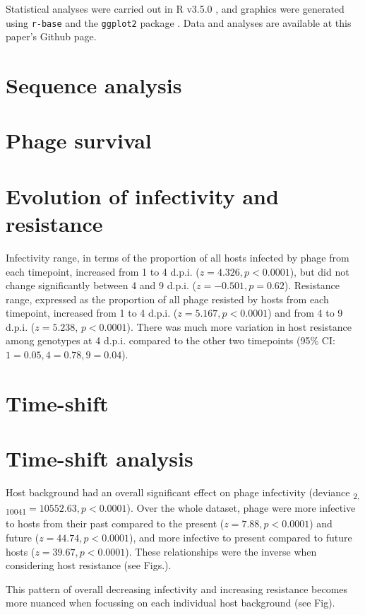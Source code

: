 \documentclass [12pt, a4paper, twoside]  {article}
\newcommand{\sub}{\textsubscript}
\begin{document}
Statistical analyses were carried out in R v3.5.0 \citep{R}, and graphics were generated using \texttt{r-base} and the \texttt{ggplot2} package \citep{ggplot2}. Data and analyses are available at this paper's Github page.

\section*{Sequence analysis}


\section*{Phage survival}


\section*{Evolution of infectivity and resistance}
Infectivity range, in terms of the proportion of all hosts infected by phage from each timepoint, increased from 1 to 4 d.p.i. ($z = 4.326, p < 0.0001$), but did not change significantly between 4 and 9 d.p.i. ($z=-0.501, p=0.62$). Resistance range, expressed as the proportion of all phage resisted by hosts from each timepoint, increased from 1 to 4 d.p.i. ($z = 5.167, p < 0.0001$) and from 4 to 9 d.p.i. ($z=5.238$, $p < 0.0001$). There was much more variation in host resistance among genotypes at 4 d.p.i. compared to the other two timepoints (95\% CI: $1=0.05, 4=0.78, 9=0.04$). 

\section*{Time-shift}

\section*{Time-shift analysis}
Host background had an overall significant effect on phage infectivity (deviance \sub{2, 10041}$=10552.63, p<0.0001$). Over the whole dataset, phage were more infective to hosts from their past compared to the present ($z = 7.88, p<0.0001$) and future ($z = 44.74, p<0.0001$), and more infective to present compared to future hosts ($z=39.67, p<0.0001$). These relationships were the inverse when considering host resistance (see Figs.). 

This pattern of overall decreasing infectivity and increasing resistance becomes more nuanced when focussing on each individual host background (see Fig). 
\end{document}
